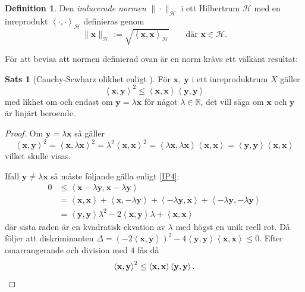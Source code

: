 \documentclass[a4paper, 12pt]{report}
\theoremstyle{definition}
\newtheorem{thm}{Sats}[section]
\newtheorem{defi}{Definition}[section]
\theoremstyle{remark}
\newcommand{\bfx}{\mathbf{x}}
\newcommand{\llangle}{\left\langle}
\newcommand{\rrangle}{\right\rangle}
\begin{document}
\begin{defi}
	Den \emph{inducerade normen} $\|\cdot\|_\mathcal{H}$ i ett Hilbertrum $\mathcal{H}$ med en inreprodukt $\llangle \cdot, \cdot\rrangle_\mathcal{H}$ definieras genom
	\begin{equation*}
		\| \mathbf{x}\|_\mathcal{H} := \sqrt{\llangle \bfx, \bfx \rrangle_\mathcal{H}} \qquad \text{där } \bfx \in \mathcal{H}.
	\end{equation*}
\end{defi}
För att bevisa att normen definierad ovan är en norm krävs ett välkänt resultat:
\begin{thm}[Cauchy-Scwharz olikhet enligt \cite{Young}]\label{CauchySchwarz}
	För $\bfx,~\mathbf{y}$ i ett inreproduktrum $X$ gäller
	\begin{equation*}
	\llangle\bfx, \mathbf{y}\rrangle^2 \leq \llangle\bfx, \bfx \rrangle \llangle \mathbf{y}, \mathbf{y} \rrangle
	\end{equation*}
	med likhet om och endast om $\mathbf{y} = \lambda \bfx$ för något $\lambda \in \mathbb{R}$, det vill säga om $\bfx$ och $\mathbf{y}$ är linjärt beroende.
\end{thm}
\begin{proof}
	Om $\mathbf{y} = \lambda \bfx$ så gäller
	\begin{equation*}
	\llangle\bfx, \mathbf{y}\rrangle^2 = \llangle\bfx, \lambda \bfx\rrangle^2 = \lambda^2\llangle\bfx, \bfx\rrangle^2 = \llangle \lambda\bfx, \lambda\bfx \rrangle\llangle \bfx, \bfx \rrangle = \llangle \mathbf{y}, \mathbf{y} \rrangle\llangle \bfx, \bfx \rrangle
	\end{equation*}
	vilket skulle visas.
	
	Ifall $\mathbf{y} \neq \lambda \bfx$ så måste följande gälla enligt \ref{IP4}:
	\begin{align*}
	0 &\leq\llangle \bfx - \lambda\mathbf{y} , \bfx - \lambda\mathbf{y} \rrangle\\
	&= \llangle \bfx, \bfx \rrangle + \llangle \bfx , - \lambda \mathbf{y} \rrangle + \llangle - \lambda \mathbf{y} , \bfx \rrangle + \llangle -\lambda\mathbf{y}, -\lambda\mathbf{y}\rrangle\\
	&=  \llangle\mathbf{y}, \mathbf{y} \rrangle \lambda^2 - 2 \llangle \bfx, \mathbf{y}\rrangle \lambda + \llangle \bfx, \bfx \rrangle
	\end{align*}
	där sista raden är en kvadratisk ekvation av $\lambda$ med högst en unik reell rot. Då följer att diskriminanten $\Delta=\left(-2\llangle\bfx, \mathbf{y}\rrangle\right)^2 - 4 \llangle \mathbf{y}, \mathbf{y}\rrangle\llangle\bfx, \bfx\rrangle\leq0$. Efter omarrangerande och division med $4$ fås då
	\begin{equation*}
	\llangle \bfx, \mathbf{y}\rrangle^2 \leq \llangle \bfx, \bfx \rrangle \llangle \mathbf{y}, \mathbf{y} \rrangle. \qedhere
	\end{equation*}
\end{proof}
\end{document}
